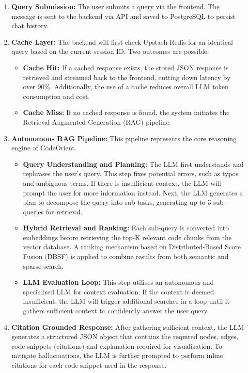 \begin{enumerate}
    \item \textbf{Query Submission:} The user submits a query via the frontend. The message is sent to the backend via API and saved to PostgreSQL to persist chat history.
    \item \textbf{Cache Layer:} The backend will first check Upstash Redis for an identical query based on the current session ID. Two outcomes are possible:
    \begin{itemize}
        \item \textbf{Cache Hit:} If a cached response exists, the stored JSON response is retrieved and streamed back to the frontend, cutting down latency by over 90\%. Additionally, the use of a cache reduces overall LLM token consumption and cost.
        \item \textbf{Cache Miss:} If no cached response is found, the system initiates the Retrieval-Augmented Generation (RAG) pipeline.
    \end{itemize}
    \item \textbf{Autonomous RAG Pipeline:} This pipeline represents the core reasoning engine of CodeOrient.
    \begin{itemize}
        \item \textbf{Query Understanding and Planning:} The LLM first understands and rephrases the user's query. This step fixes potential errors, such as typos and ambiguous terms. If there is insufficient context, the LLM will prompt the user for more information instead. Next, the LLM generates a plan to decompose the query into sub-tasks, generating up to 3 sub-queries for retrieval.
        \item \textbf{Hybrid Retrieval and Ranking:} Each sub-query is converted into embeddings before retrieving the top-K relevant code chunks from the vector database. A ranking mechanism based on Distributed-Based Score Fusion (DBSF) is applied to combine results from both semantic and sparse search. 
        \item \textbf{LLM Evaluation Loop:} This step utilises an autonomous and specialised LLM for context evaluation. If the context is deemed insufficient, the LLM will trigger additional searches in a loop until it gathers sufficient context to confidently answer the user query. 
    \end{itemize}
    \item \textbf{Citation Grounded Response:} After gathering sufficient context, the LLM generates a structured JSON object that contains the required nodes, edges, code snippets (citations) and explanation required for visualisation. To mitigate hallucinations, the LLM is further prompted to perform inline citations for each code snippet used in the response.

\end{enumerate}
